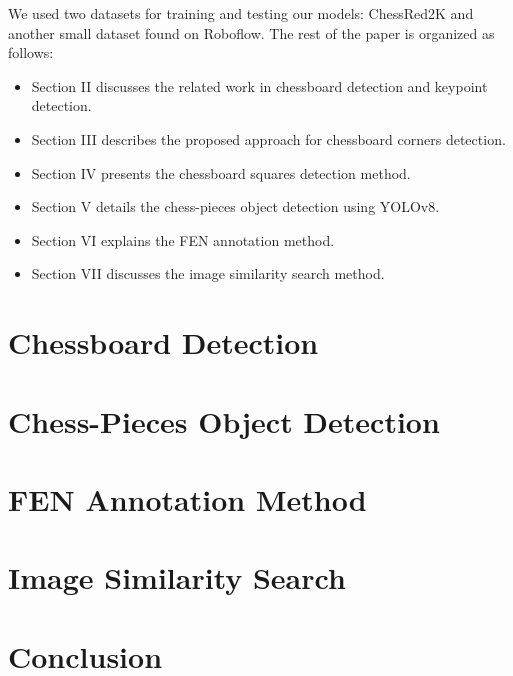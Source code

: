 \documentclass[conference]{IEEEtran}
\begin{document}
We used two datasets for training and testing our models: ChessRed2K and another small dataset found on Roboflow.
The rest of the paper is organized as follows: 
\begin{itemize}
    \item Section II discusses the related work in chessboard detection and keypoint detection.
    \item Section III describes the proposed approach for chessboard corners detection.
    \item Section IV presents the chessboard squares detection method.
    \item Section V details the chess-pieces object detection using YOLOv8.
    \item Section VI explains the FEN annotation method.
    \item Section VII discusses the image similarity search method.
\end{itemize}



\section{Chessboard Detection}


\section{Chess-Pieces Object Detection}


\section{FEN Annotation Method}
 

\section{Image Similarity Search}


\section{Conclusion}




\vspace{12pt}
\end{document}
